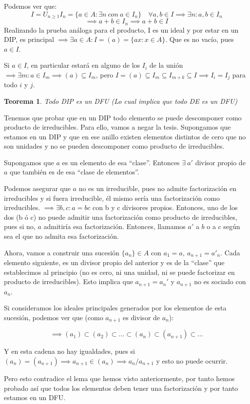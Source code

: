 \documentclass[11pt, a4paper, titlepage]{article}
\makeatletter
\renewenvironment{proof}[1][\proofname] {\vspace{-15pt}\par\pushQED{\qed}\normalfont\topsep6\p@\@plus6\p@\relax\trivlist\item[\hskip\labelsep\it#1\@addpunct{.}]\ignorespaces}{\popQED\endtrivlist\@endpefalse}
\theoremstyle{theorem-style}
\newtheorem*{nth}{Teorema}
\theoremstyle{definition-style}
\theoremstyle{remark-style}
\theoremstyle{example-style}
\makeatother
\begin{document}
	\begin{proof}[Demostración del lema.]
	Podemos ver que: 
	\[
	I = U_{n\geq 1} I_n = \{a \in A : \exists n \ con \ a \in I_n\} \quad \forall a,b \in I \implies \exists n: a,b \in I_n\]\[ \implies a+b \in I_n \implies a+b \in I
	\]
	Realizando la prueba análoga para el producto, I es un ideal y por estar en un DIP, es principal $\implies \exists a \in A : I = (a) = \{ax : x \in A\}$. Que es no vacío, pues $a \in I$.
	
	Si $a\in I$, en particular estará en alguno de los $I_i$ de la unión $\implies \exists m : a \in I_m \implies (a) \subseteq I_m$, pero  $I = (a) \subseteq I_m \subseteq I_{m+k} \subseteq I \implies I_i = I_j$ para todo $i$ y $j$. 
	
\end{proof}

\begin{nth}
	Todo DIP es un DFU (Lo cual implica que todo DE es un DFU)
\end{nth}
\begin{proof}
	Tenemos que probar que en un DIP todo elemento se puede descomponer como producto de irreducibles. Para ello, vamos a negar la tesis. Supongamos que estamos en un DIP y que en ese anillo existen elementos distintos de cero que no son unidades y no se pueden descomponer como producto de irreducibles.
	
	Supongamos que $a$ es un elemento de esa “clase”. Entonces $\exists  \ a'$ divisor propio de $a$ que también es de esa “clase de elementos”.
	
	Podemos asegurar que $a$ no es un irreducible, pues no admite factorización en irreducibles y si fuera irreducible, él mismo sería una factorización como irreducibles. $\implies \exists b,c : a = bc$ con b y c divisores propios. Entonces, uno de los dos (b ó c) no puede admitir una factorización como producto de irreducibles, pues si no, $a$ admitiría esa factorización. Entonces, llamamos $a'$ a $b$ o a $c$ según sea el que no admita esa factorización.
	
	Ahora, vamos a construir una sucesión $\{a_n\} \in A$ con $a_1 = a,\ a_{n+1}=a'_n$. Cada elemento siguiente, es un divisor propio del anterior y es de la “clase” que establecimos al principio (no es cero, ni una unidad, ni se puede factorizar en producto de irreducibles). Esto implica que $a_{n+1} = a_n'$ y $a_{n+1}$ no es sociado con $a_n$.
	
	Si consideramos los ideales principales generados por los elementos de esta sucesión, podemos ver que (como $a_{n+1}$ es divisor de $a_n$):
	
	\[
	\implies (a_1) \subset (a_2) \subset ... \subset (a_n) \subset (a_{n+1}) \subset ...	\]
	
	Y en esta cadena no hay igualdades, pues si $(a_n) = (a_{n+1}) \implies a_{n+1} \in (a_n) \implies a_n/ a_{n+1}$ y esto no puede ocurrir.
	
	Pero esto contradice el lema que hemos visto anteriormente, por tanto hemos probado así que todos los elementos deben tener una factorización y por tanto estamos en un DFU.
\end{proof}
\end{document}
